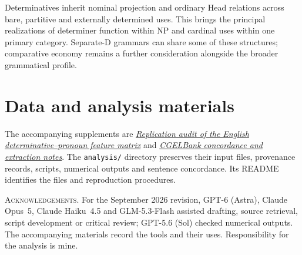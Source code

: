 \documentclass[12pt]{article}
\begin{document}
Determinatives inherit nominal projection and ordinary Head relations across bare, partitive and externally determined uses. This brings the principal realizations of determiner function within NP and cardinal uses within one primary category. Separate-D grammars can share some of these structures; comparative economy remains a further consideration alongside the broader grammatical profile.

\section*{Data and analysis materials}

The accompanying supplements are \href{run:matrix-audit.pdf}{\textit{Replication audit of the English determinative--pronoun feature matrix}} and \href{run:corpus-documentation.pdf}{\textit{CGELBank concordance and extraction notes}}. The \texttt{analysis/} directory preserves their input files, provenance records, scripts, numerical outputs and sentence concordance. Its README identifies the files and reproduction procedures.

\vspace{0.5\baselineskip}
\noindent\textsc{Acknowledgements.} For the September 2026 revision, GPT-6 (Astra), Claude Opus~5, Claude Haiku~4.5 and GLM-5.3-Flash assisted drafting, source retrieval, script development or critical review; GPT-5.6 (Sol) checked numerical outputs. The accompanying materials record the tools and their uses. Responsibility for the analysis is mine.

\clearpage
\printbibliography
\end{document}
